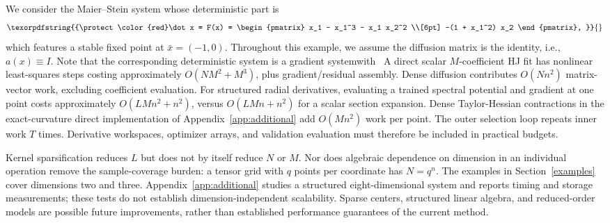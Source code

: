 \documentclass[11pt]{article}
\theoremstyle{plain}      %
\theoremstyle{definition} %
\providecommand{\DIFaddtex}[1]{{\protect\color{blue}#1}} %
\providecommand{\DIFdeltex}[1]{{\protect\color{red}#1}} %
\providecommand{\DIFaddbegin}{} %
\providecommand{\DIFdelbegin}{} %
\providecommand{\DIFdelend}{} %
\providecommand{\DIFadd}[1]{\texorpdfstring{\DIFaddtex{#1}}{#1}} %
\providecommand{\DIFdel}[1]{\texorpdfstring{\DIFdeltex{#1}}{}} %
\newcommand{\DIFscaledelfig}{1.0}
\newlength{\DIFdelgraphicswidth} %
\newlength{\DIFdelgraphicsheight} %
\newcommand{\DIFaddincludegraphics}[2][]{{\color{blue}\fbox{\DIFOincludegraphics[#1]{#2}}}} %
\newcommand{\DIFdelincludegraphics}[2][]{%
\sbox{\DIFdelgraphicsbox}{\DIFOincludegraphics[#1]{#2}}%
\settoboxwidth{\DIFdelgraphicswidth}{\DIFdelgraphicsbox} %
\settoboxtotalheight{\DIFdelgraphicsheight}{\DIFdelgraphicsbox} %
\scalebox{\DIFscaledelfig}{%
\parbox[b]{\DIFdelgraphicswidth}{\usebox{\DIFdelgraphicsbox}\\[-\baselineskip] \rule{\DIFdelgraphicswidth}{0em}}\llap{\resizebox{\DIFdelgraphicswidth}{\DIFdelgraphicsheight}{%
\setlength{\unitlength}{\DIFdelgraphicswidth}%
\begin{picture}(1,1)%
\thicklines\linethickness{2pt} %
{\color[rgb]{1,0,0}\put(0,0){\framebox(1,1){}}}%
{\color[rgb]{1,0,0}\put(0,0){\line( 1,1){1}}}%
{\color[rgb]{1,0,0}\put(0,1){\line(1,-1){1}}}%
\end{picture}%
}\hspace*{3pt}}} %
} %
\DeclareRobustCommand{\DIFaddbegin}{\DIFOaddbegin \let\includegraphics\DIFaddincludegraphics} %
\DeclareRobustCommand{\DIFdelbegin}{\DIFOdelbegin \let\includegraphics\DIFdelincludegraphics} %
\DeclareRobustCommand{\DIFdelend}{\DIFOaddend \let\includegraphics\DIFOincludegraphics} %
\begin{document}
\DIFdelbegin \DIFdel{We consider the Maier--Stein system whose deterministic part is
}\[
\DIFdel{\dot x = F(x) =
\begin{pmatrix}
x_1 - x_1^3 - x_1 x_2^2 \\[6pt]
-(1 + x_1^2) x_2
\end{pmatrix},
}\]%
\DIFdel{which features a stable fixed point at \( \bar{x} = (-1,0) \). Throughout this example, we assume the diffusion matrix is the identity, i.e., $a(x) \equiv I$. Note that the corresponding deterministic system is a gradient systemwith }\DIFdelend\ \DIFaddbegin \DIFadd{A direct scalar $M$-coefficient HJ fit has nonlinear least-squares steps costing approximately $O(NM^2+M^3)$, plus gradient/residual assembly. Dense diffusion contributes $O(Nn^2)$ matrix-vector work, excluding coefficient evaluation. For structured radial derivatives, evaluating a trained spectral potential and gradient at one point costs approximately $O(LMn^2+n^2)$, versus $O(LMn+n^2)$ for a scalar section expansion. Dense Taylor-Hessian contractions in the exact-curvature direct implementation of Appendix~\ref{app:additional} add $O(Mn^2)$ work per point. The outer selection loop repeats inner work $T$ times. Derivative workspaces, optimizer arrays, and validation evaluation must therefore be included in practical budgets.
}

\DIFadd{Kernel sparsification reduces $L$ but does not by itself reduce $N$ or $M$. Nor does algebraic dependence on dimension in an individual operation remove the sample-coverage burden: a tensor grid with $q$ points per coordinate has $N=q^n$. The examples in Section~\ref{examples} cover dimensions two and three. Appendix~\ref{app:additional} studies a structured eight-dimensional system and reports timing and storage measurements; these tests do not establish dimension-independent scalability. Sparse centers, structured linear algebra, and reduced-order models are possible future improvements, rather than established performance guarantees of the current method.
}
\end{document}
